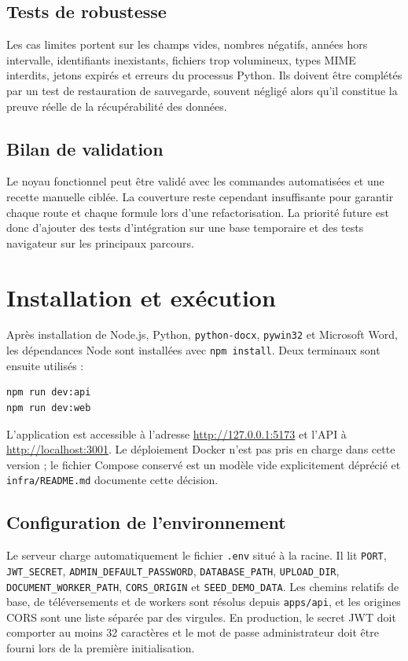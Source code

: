 \documentclass[12pt,a4paper,oneside]{report}
\newcommand{\code}[1]{\texttt{#1}}
\begin{document}
\subsection{Tests de robustesse}
Les cas limites portent sur les champs vides, nombres négatifs, années hors intervalle, identifiants inexistants, fichiers trop volumineux, types MIME interdits, jetons expirés et erreurs du processus Python. Ils doivent être complétés par un test de restauration de sauvegarde, souvent négligé alors qu'il constitue la preuve réelle de la récupérabilité des données.

\subsection{Bilan de validation}
Le noyau fonctionnel peut être validé avec les commandes automatisées et une recette manuelle ciblée. La couverture reste cependant insuffisante pour garantir chaque route et chaque formule lors d'une refactorisation. La priorité future est donc d'ajouter des tests d'intégration sur une base temporaire et des tests navigateur sur les principaux parcours.

\section{Installation et exécution}
Après installation de Node.js, Python, \code{python-docx}, \code{pywin32} et Microsoft Word, les dépendances Node sont installées avec \code{npm install}. Deux terminaux sont ensuite utilisés :
\begin{lstlisting}[language=bash,caption={Démarrage local}]
npm run dev:api
npm run dev:web
\end{lstlisting}
L'application est accessible à l'adresse \url{http://127.0.0.1:5173} et l'API à \url{http://localhost:3001}. Le déploiement Docker n'est pas pris en charge dans cette version ; le fichier Compose conservé est un modèle vide explicitement déprécié et \code{infra/README.md} documente cette décision.

\subsection{Configuration de l'environnement}
Le serveur charge automatiquement le fichier \code{.env} situé à la racine. Il lit \code{PORT}, \code{JWT\_SECRET}, \code{ADMIN\_DEFAULT\_PASSWORD}, \code{DATABASE\_PATH}, \code{UPLOAD\_DIR}, \code{DOCUMENT\_WORKER\_PATH}, \code{CORS\_ORIGIN} et \code{SEED\_DEMO\_DATA}. Les chemins relatifs de base, de téléversements et de workers sont résolus depuis \code{apps/api}, et les origines CORS sont une liste séparée par des virgules. En production, le secret JWT doit comporter au moins 32 caractères et le mot de passe administrateur doit être fourni lors de la première initialisation.
\end{document}
